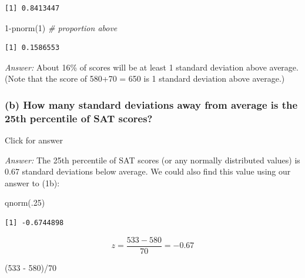 \documentclass[
]{book}
\newenvironment{Shaded}{\begin{snugshade}}{\end{snugshade}}
\newcommand{\CommentTok}[1]{\textcolor[rgb]{0.56,0.35,0.01}{\textit{#1}}}
\newcommand{\DecValTok}[1]{\textcolor[rgb]{0.00,0.00,0.81}{#1}}
\newcommand{\FunctionTok}[1]{\textcolor[rgb]{0.00,0.00,0.00}{#1}}
\newcommand{\NormalTok}[1]{#1}
\newcommand{\SpecialCharTok}[1]{\textcolor[rgb]{0.00,0.00,0.00}{#1}}
\begin{document}
\begin{verbatim}
[1] 0.8413447
\end{verbatim}

\begin{Shaded}
\begin{Highlighting}[]
\DecValTok{1}\SpecialCharTok{{-}}\FunctionTok{pnorm}\NormalTok{(}\DecValTok{1}\NormalTok{) }\CommentTok{\# proportion above}
\end{Highlighting}
\end{Shaded}

\begin{verbatim}
[1] 0.1586553
\end{verbatim}

\emph{Answer:} About 16\% of scores will be at least 1 standard deviation above average. (Note that the score of 580+70 = 650 is 1 standard deviation above average.)

\hypertarget{b-how-many-standard-deviations-away-from-average-is-the-25th-percentile-of-sat-scores}{%
\subsubsection{(b) How many standard deviations away from average is the 25th percentile of SAT scores?}\label{b-how-many-standard-deviations-away-from-average-is-the-25th-percentile-of-sat-scores}}

Click for answer

\emph{Answer:} The 25th percentile of SAT scores (or any normally distributed values) is 0.67 standard deviations below average. We could also find this value using our answer to (1b):

\hfill\break

\begin{Shaded}
\begin{Highlighting}[]
\FunctionTok{qnorm}\NormalTok{(.}\DecValTok{25}\NormalTok{)}
\end{Highlighting}
\end{Shaded}

\begin{verbatim}
[1] -0.6744898
\end{verbatim}

\[
z = \dfrac{533 - 580}{70} = -0.67
\]

\begin{Shaded}
\begin{Highlighting}[]
\NormalTok{(}\DecValTok{533} \SpecialCharTok{{-}} \DecValTok{580}\NormalTok{)}\SpecialCharTok{/}\DecValTok{70}
\end{Highlighting}
\end{Shaded}
\end{document}
